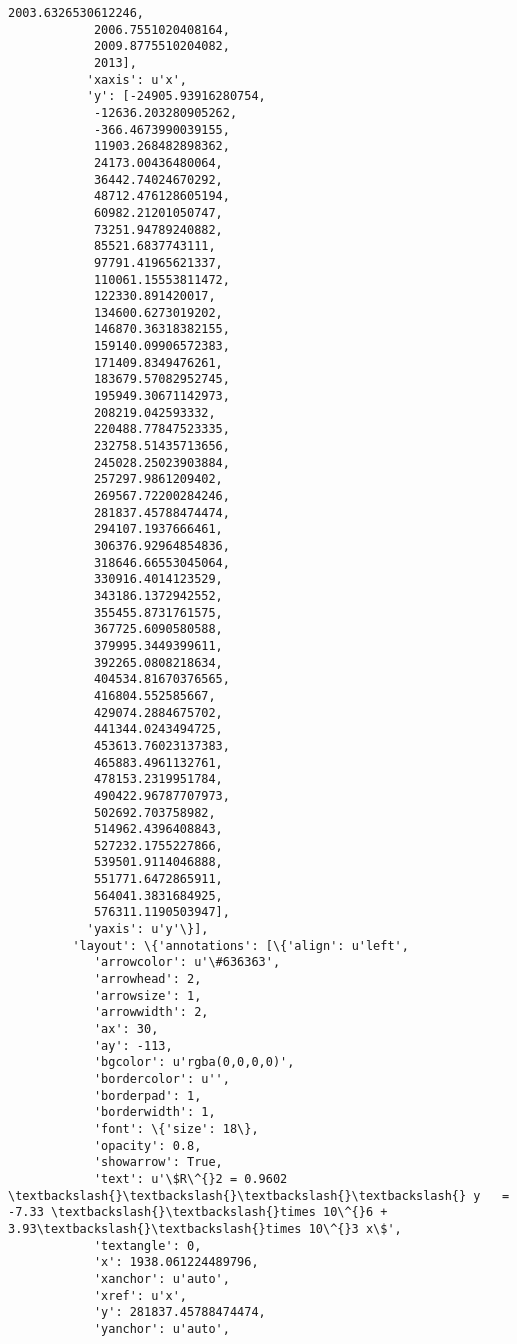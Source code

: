 \documentclass{article}
\begin{document}
\begin{Verbatim}[commandchars=\\\{\}]
            2003.6326530612246,
            2006.7551020408164,
            2009.8775510204082,
            2013],
           'xaxis': u'x',
           'y': [-24905.93916280754,
            -12636.203280905262,
            -366.4673990039155,
            11903.268482898362,
            24173.00436480064,
            36442.74024670292,
            48712.476128605194,
            60982.21201050747,
            73251.94789240882,
            85521.6837743111,
            97791.41965621337,
            110061.15553811472,
            122330.891420017,
            134600.6273019202,
            146870.36318382155,
            159140.09906572383,
            171409.8349476261,
            183679.57082952745,
            195949.30671142973,
            208219.042593332,
            220488.77847523335,
            232758.51435713656,
            245028.25023903884,
            257297.9861209402,
            269567.72200284246,
            281837.45788474474,
            294107.1937666461,
            306376.92964854836,
            318646.66553045064,
            330916.4014123529,
            343186.1372942552,
            355455.8731761575,
            367725.6090580588,
            379995.3449399611,
            392265.0808218634,
            404534.81670376565,
            416804.552585667,
            429074.2884675702,
            441344.0243494725,
            453613.76023137383,
            465883.4961132761,
            478153.2319951784,
            490422.96787707973,
            502692.703758982,
            514962.4396408843,
            527232.1755227866,
            539501.9114046888,
            551771.6472865911,
            564041.3831684925,
            576311.1190503947],
           'yaxis': u'y'\}],
         'layout': \{'annotations': [\{'align': u'left',
            'arrowcolor': u'\#636363',
            'arrowhead': 2,
            'arrowsize': 1,
            'arrowwidth': 2,
            'ax': 30,
            'ay': -113,
            'bgcolor': u'rgba(0,0,0,0)',
            'bordercolor': u'',
            'borderpad': 1,
            'borderwidth': 1,
            'font': \{'size': 18\},
            'opacity': 0.8,
            'showarrow': True,
            'text': u'\$R\^{}2 = 0.9602 \textbackslash{}\textbackslash{}\textbackslash{}\textbackslash{} y   = -7.33 \textbackslash{}\textbackslash{}times 10\^{}6 + 3.93\textbackslash{}\textbackslash{}times 10\^{}3 x\$',
            'textangle': 0,
            'x': 1938.061224489796,
            'xanchor': u'auto',
            'xref': u'x',
            'y': 281837.45788474474,
            'yanchor': u'auto',

\end{Verbatim}
\end{document}
